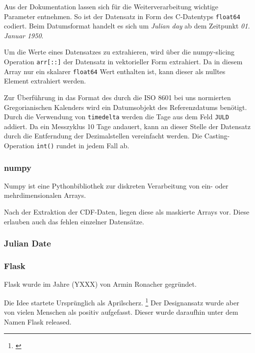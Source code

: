     Aus der Dokumentation lassen sich für die Weiterverarbeitung wichtige Parameter entnehmen.
    So ist der Datensatz in Form des C-Datentyps \texttt{float64} codiert. Beim Datumsformat handelt es sich um \textit{Julian day} ab dem Zeitpunkt \textit{01. Januar 1950}.
    
    Um die Werte eines Datensatzes zu extrahieren, wird über die numpy-slicing Operation \texttt{arr[::]} der Datensatz in vektorieller Form extrahiert. Da in diesem Array nur ein skalarer \texttt{float64} Wert enthalten ist, kann dieser als nulltes Element extrahiert werden.
    
    Zur Überführung in das Format des durch die ISO 8601 bei uns normierten Gregorianischen Kalenders wird ein Datumsobjekt des Referenzdatums benötigt. Durch die Verwendung von \texttt{timedelta} werden die Tage aus dem Feld \texttt{JULD} addiert. Da ein Messzyklus 10 Tage andauert, kann an dieser Stelle der Datensatz durch die Entferndung der Dezimalstellen vereinfacht werden. Die Casting-Operation \texttt{int()} rundet in jedem Fall ab.
    
    \subsubsection{numpy}
    
    Numpy ist eine Pythonbibliothek zur diskreten Verarbeitung von ein- oder mehrdimensionalen Arrays. 
    
    Nach der Extraktion der CDF-Daten, liegen diese als maskierte Arrays vor. Diese erlauben auch das fehlen einzelner Datensätze.

\subsubsection{Julian Date}
        
    \subsubsection{Flask}
    
    Flask wurde im Jahre (YXXX) von Armin Ronacher gegründet. 
    
    Die Idee startete Ursprünglich als Aprilscherz. \footnote{\cite{openingtheflask}} Der Designansatz wurde aber von vielen Menschen als positiv aufgefasst. Dieser wurde daraufhin unter dem Namen Flask released.
    
    
